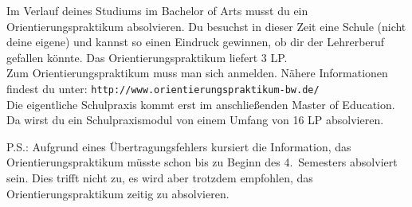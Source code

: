 Im Verlauf deines Studiums im Bachelor of Arts
musst du ein Orientierungspraktikum absolvieren.
Du besuchst in dieser Zeit eine Schule (nicht deine eigene)
und kannst so einen Eindruck gewinnen,
ob dir der Lehrerberuf gefallen könnte.
Das Orientierungspraktikum liefert 3 LP.\\
Zum Orientierungspraktikum muss man sich anmelden.
Nähere Informationen findest du unter:
\verb|http://www.orientierungspraktikum-bw.de/|\\
Die eigentliche Schulpraxis kommt erst im anschließenden
Master of Education.
Da wirst du ein Schulpraxismodul
von einem Umfang von 16 LP absolvieren.

{\small P.S.: Aufgrund eines Übertragungsfehlers
kursiert die Information,
das Orientierungspraktikum müsste schon
bis zu Beginn des 4.\ Semesters absolviert sein.
Dies trifft nicht zu, es wird aber trotzdem empfohlen,
das Orientierungspraktikum zeitig zu absolvieren.}

\vspace*{1cm}



